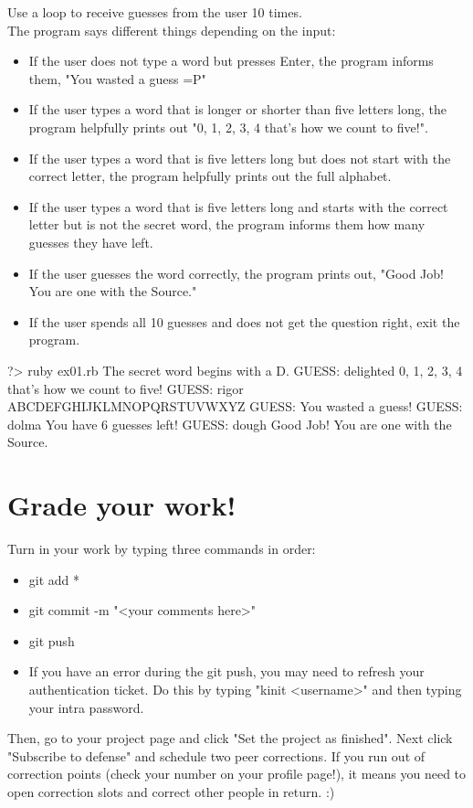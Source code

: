 \documentclass{42-en}
\begin{document}
Use a loop to receive guesses from the user 10 times.\\

The program says different things depending on the input:
\begin{itemize}
\item If the user does not type a word but presses Enter, the program informs them, "You wasted a guess =P"
\item If the user types a word that is longer or shorter than five letters long, the program helpfully prints out "0, 1, 2, 3, 4 that's how we count to five!". 
\item If the user types a word that is five letters long but does not start with the correct letter, the program helpfully prints out the full alphabet.
\item If the user types a word that is five letters long and starts with the correct letter but is not the secret word, the program informs them how many guesses they have left.
\item If the user guesses the word correctly, the program prints out, "Good Job! You are one with the Source."
\item If the user spends all 10 guesses and does not get the question right, exit the program.
\end{itemize}
\begin{42console}
	?> ruby ex01.rb
	The secret word begins with a D.
	GUESS: delighted
	0, 1, 2, 3, 4 that's how we count to five!
	GUESS: rigor
	ABCDEFGHIJKLMNOPQRSTUVWXYZ
	GUESS:
	You wasted a guess!
	GUESS: dolma
	You have 6 guesses left!
	GUESS: dough
	Good Job! You are one with the Source.
\end{42console}


\chapter{Grade your work!}

Turn in your work by typing three commands in order: 
\begin{itemize}
	\item git add *
	\item git commit -m "<your comments here>"
	\item git push
	\item If you have an error during the git push, you may need to refresh your authentication ticket. Do this by typing "kinit <username>" and then typing your intra password.
\end{itemize}

Then, go to your project page and click "Set the project as finished".
Next click "Subscribe to defense" and schedule two peer corrections.
If you run out of correction points (check your number on your profile page!), it means you need to open correction slots and correct other people in return. :)
\end{document}
